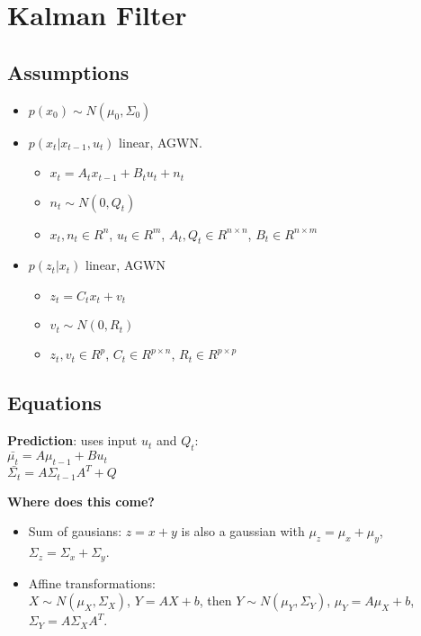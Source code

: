 \section{Kalman Filter}
\subsection*{Assumptions}
\begin{itemize}
  \item $p(x_0) \sim N(\mu_0, \Sigma_0)$
  \item $p(x_t|x_{t-1}, u_t)$ linear, AGWN.
    \begin{itemize}
      \item $x_t = A_t x_{t-1} + B_t u_t + n_t$
      \item $n_t \sim N(0, Q_t)$
      \item $x_t, n_t \in R^n$, $u_t \in R^m$, 
        $A_t, Q_t \in R^{n\times n}$, $B_t \in R^{n \times m}$
    \end{itemize}
  \item $p(z_t|x_t)$ linear, AGWN
    \begin{itemize}
      \item $z_t = C_t x_t + v_t$
      \item $v_t \sim N(0, R_t)$
      \item $z_t, v_t \in R^p$, $C_t \in R^{p \times n}$, $R_t \in R^{p
        \times p}$
    \end{itemize}
\end{itemize}

\subsection*{Equations}
\textbf{Prediction}: uses input $u_t$ and $Q_t$:\\
$\bar{\mu_t} = A \mu_{t-1} + B u_t$ \\
$\bar{\Sigma_t} = A \Sigma_{t-1} A^T + Q$

\textbf{Where does this come?}
\begin{itemize}
  \item Sum of gausians: $z = x + y$ is also a gaussian with $\mu_z =
    \mu_x + \mu_y$, $\Sigma_z = \Sigma_x + \Sigma_y$.
  \item Affine transformations: \\$X \sim N(\mu_X, \Sigma_X)$, $Y= AX +
    b$, then $Y \sim N(\mu_Y, \Sigma_Y)$, $\mu_Y = A \mu_X + b$,\\
    $\Sigma_Y = A \Sigma_X A^T$.
\end{itemize}

